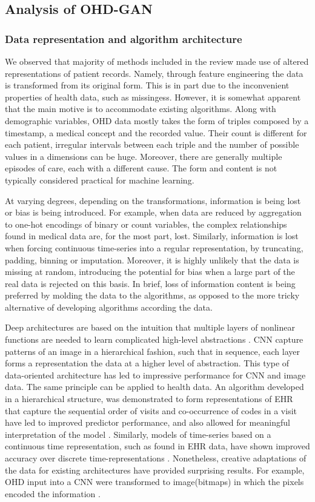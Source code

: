 \subsection{Analysis of OHD-GAN}
\subsubsection{Data representation and algorithm architecture}
We observed that majority of methods included in the review made use of  altered representations of patient records. Namely, through feature engineering the data is transformed from its original form. This is in part due to the inconvenient properties of health data, such as missingess. However, it is somewhat apparent that the main motive is to accommodate existing algorithms. Along with demographic variables, OHD data mostly takes the form of triples composed by a timestamp, a medical concept and the recorded value. Their count is different for each patient, irregular intervals between each triple and the number of possible values in a dimensions can be huge. Moreover, there are generally multiple episodes of care, each with a different cause. The form and content is not typically considered practical for machine learning. \par
At varying degrees, depending on the transformations, information is being lost or bias is being  introduced. For example, when data are reduced by aggregation to one-hot encodings of binary or count variables, the complex relationships found in medical data are, for the most part, lost. Similarly, information is lost when forcing continuous time-series into a regular representation, by truncating, padding, binning or imputation. Moreover, it is highly unlikely that the data is missing at random, introducing the potential for bias when a large part of the real data is rejected on this basis.  In brief, loss of information content is being preferred by molding the data to the algorithms, as opposed to the more tricky alternative of developing algorithms according the data.\par
Deep architectures are based on the intuition that multiple layers of nonlinear functions are needed to learn complicated high-level abstractions \cite{Bengio_2009}. CNN capture patterns of an image in a hierarchical fashion, such that in sequence, each layer forms a representation the data at a higher level of abstraction. This type of data-oriented architecture has led to impressive performance for CNN and image data. The same principle can be applied to health data. An algorithm developed in a hierarchical structure, was demonstrated to form representations of EHR that capture the sequential order of visits and co-occurrence of codes in a visit have led to improved predictor performance, and also allowed for meaningful interpretation of the model \cite{choi2016multi}. Similarly, models of time-series based on a continuous time representation, such as found in EHR data, have shown improved accuracy over discrete time-representations \cite{rubanova2019latent,de2019gru}. Nonetheless, creative adaptations of the data for existing architectures have provided surprising results. For example, OHD input into a CNN were transformed to image(bitmaps) in which the pixels encoded the information \cite{Fukae2020}.

